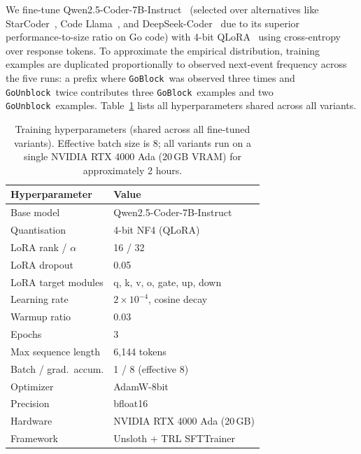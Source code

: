 \documentclass[10pt,conference]{IEEEtran}
\newcommand{\eblock}{\texttt{GoBlock}}
\newcommand{\eunblock}{\texttt{GoUnblock}}
\begin{document}
We fine-tune Qwen2.5-Coder-7B-Instruct~\cite{qwen} (selected over alternatives like StarCoder~\cite{li2023starcoder}, Code Llama~\cite{roziere2023codellama}, and DeepSeek-Coder~\cite{guo2024deepseekcoder} due to its superior performance-to-size ratio on Go code) with 4-bit
QLoRA~\cite{qlora,lora} using cross-entropy over response tokens.
To approximate the empirical distribution, training examples are
duplicated proportionally to observed next-event frequency across the
five runs: a prefix where \eblock\ was observed three times and
\eunblock\ twice contributes three \eblock\ examples and two
\eunblock\ examples.
Table~\ref{tab:hparams} lists all hyperparameters shared across all
variants.

\begin{table}[t]
\centering
\caption{Training hyperparameters (shared across all fine-tuned
variants). Effective batch size is 8; all variants run on a single
NVIDIA RTX 4000 Ada (20\,GB VRAM) for approximately 2 hours.}
\label{tab:hparams}
\vspace*{8pt}
\small
\begin{tabular}{@{}ll@{}}
\toprule
\textbf{Hyperparameter} & \textbf{Value}\\
\midrule
Base model               & Qwen2.5-Coder-7B-Instruct\\
Quantisation             & 4-bit NF4 (QLoRA)\\
LoRA rank / $\alpha$     & 16 / 32\\
LoRA dropout             & 0.05\\
LoRA target modules      & q, k, v, o, gate, up, down\\
Learning rate            & $2\times10^{-4}$, cosine decay\\
Warmup ratio             & 0.03\\
Epochs                   & 3\\
Max sequence length      & 6{,}144 tokens\\
Batch / grad.\ accum.    & 1 / 8 (effective 8)\\
Optimizer                & AdamW-8bit\\
Precision                & bfloat16\\
Hardware                 & NVIDIA RTX 4000 Ada (20\,GB)\\
Framework                & Unsloth + TRL SFTTrainer\\
\bottomrule
\end{tabular}
\end{table}
\end{document}
